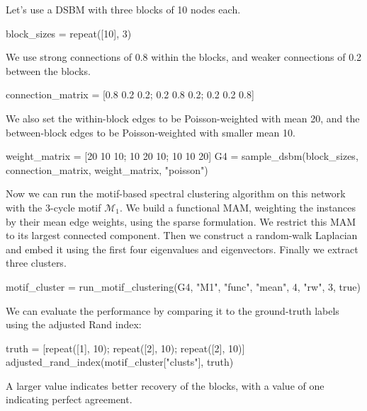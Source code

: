 \documentclass{article}
\begin{document}
Let's use a DSBM with three blocks of 10 nodes each.

\begin{tcolorbox}[colback=black!5!white,colframe=black!15!white]
\begin{juliablock}
block_sizes = repeat([10], 3)
\end{juliablock}
\end{tcolorbox}

We use strong connections of 0.8 within the blocks,
and weaker connections of 0.2 between the blocks.

\begin{tcolorbox}[colback=black!5!white,colframe=black!15!white]
\begin{juliablock}
connection_matrix = [0.8 0.2 0.2; 0.2 0.8 0.2; 0.2 0.2 0.8]
\end{juliablock}
\end{tcolorbox}

We also set the within-block edges to be Poisson-weighted with
mean 20,
and the between-block edges to be Poisson-weighted with smaller
mean 10.

\begin{tcolorbox}[colback=black!5!white,colframe=black!15!white]
\begin{juliablock}
weight_matrix = [20 10 10; 10 20 10; 10 10 20]
G4 = sample_dsbm(block_sizes, connection_matrix, weight_matrix, "poisson")
\end{juliablock}
\end{tcolorbox}

Now we can run the motif-based spectral clustering algorithm
on this network with the 3-cycle motif $\mathcal{M}_1$.
We build a functional MAM,
weighting the instances by their mean edge weights,
using the sparse formulation.
We restrict this MAM to its largest connected component.
Then we construct a random-walk Laplacian and embed it using the
first four eigenvalues and eigenvectors.
Finally we extract three clusters.

\begin{tcolorbox}[colback=black!5!white,colframe=black!15!white]
\begin{juliablock}
motif_cluster = run_motif_clustering(G4, "M1", "func",
                                     "mean", 4, "rw", 3, true)
\end{juliablock}
\end{tcolorbox}

We can evaluate the performance by comparing it to the ground-truth
labels using the adjusted Rand index:

\begin{tcolorbox}[colback=black!5!white,colframe=black!15!white]
\begin{juliablock}
truth = [repeat([1], 10); repeat([2], 10); repeat([2], 10)]
adjusted_rand_index(motif_cluster["clusts"], truth)
\end{juliablock}
\end{tcolorbox}

A larger value indicates better recovery of the blocks,
with a value of one indicating perfect agreement.



\end{document}
